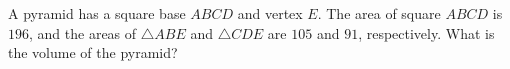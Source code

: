 A pyramid has a square base $ABCD$ and vertex $E$. The area of square $ABCD$ is $196$, and the areas of $\triangle ABE$ and $\triangle CDE$ are $105$ and $91$, respectively. What is the volume of the pyramid?
